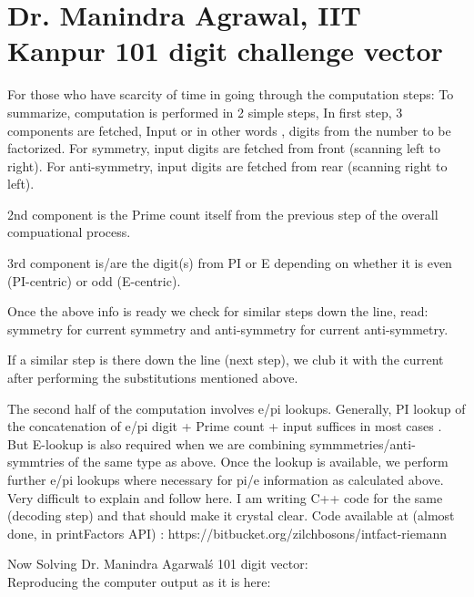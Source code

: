 \section{Dr. Manindra Agrawal, IIT Kanpur 101 digit challenge vector}

For those who have scarcity of time in going through the computation steps:
To summarize, 
computation is performed in 2 simple steps,
In first step, 3 components are fetched,
Input or in other words , digits from the number to be factorized.
For symmetry, input digits are fetched from front (scanning left to right).
For anti-symmetry, input digits are fetched from rear (scanning right to left).

2nd component is the Prime count itself from the previous step of the overall compuational process.

3rd component is/are the digit(s) from PI or E depending on whether it is even (PI-centric) or odd (E-centric).

Once the above info is ready we check for similar steps down the line, read: symmetry for current symmetry and anti-symmetry for current anti-symmetry.

If a similar step is there down the line (next step), we club it with the current after performing the substitutions mentioned above.

The second half of the computation involves e/pi lookups. Generally, PI lookup of the concatenation of e/pi digit + Prime count + input suffices in most cases .
But E-lookup is also required when we are combining symmmetries/anti-symmtries of the same type as above.
Once the lookup is available, we perform further e/pi lookups where necessary for pi/e information as calculated above.
Very difficult to explain and follow here. I am writing C++ code for the same (decoding step) and that should make it crystal clear.
Code available at (almost done, in printFactors API) : https://bitbucket.org/zilchbosons/intfact-riemann

Now Solving Dr. Manindra Agarwal\'s 101 digit vector:\\
Reproducing the computer output as it is here:\\

